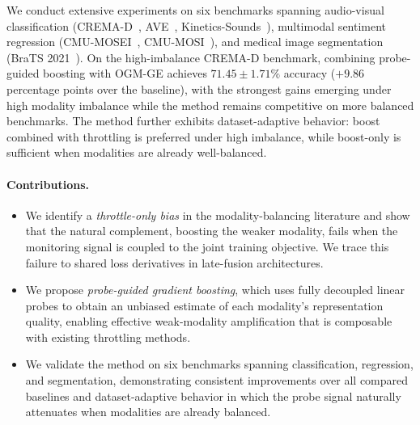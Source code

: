 \documentclass{article}
\begin{document}

We conduct extensive experiments on six benchmarks spanning audio-visual classification (CREMA-D~\citep{cao2014cremad}, AVE~\citep{tian2018ave}, Kinetics-Sounds~\citep{arandjelovic2017kinetics}), multimodal sentiment regression (CMU-MOSEI~\citep{zadeh2018mosei}, CMU-MOSI~\citep{zadeh2016mosi}), and medical image segmentation (BraTS 2021~\citep{baid2021brats}). On the high-imbalance CREMA-D benchmark, combining probe-guided boosting with OGM-GE achieves $71.45 \pm 1.71\%$ accuracy ($+9.86$ percentage points over the baseline), with the strongest gains emerging under high modality imbalance while the method remains competitive on more balanced benchmarks. The method further exhibits dataset-adaptive behavior: boost combined with throttling is preferred under high imbalance, while boost-only is sufficient when modalities are already well-balanced.

\paragraph{Contributions.}
\begin{itemize}
    \item We identify a \emph{throttle-only bias} in the modality-balancing literature and show that the natural complement, boosting the weaker modality, fails when the monitoring signal is coupled to the joint training objective. We trace this failure to shared loss derivatives in late-fusion architectures.

    \item We propose \emph{probe-guided gradient boosting}, which uses fully decoupled linear probes to obtain an unbiased estimate of each modality's representation quality, enabling effective weak-modality amplification that is composable with existing throttling methods.

    \item We validate the method on six benchmarks spanning classification, regression, and segmentation, demonstrating consistent improvements over all compared baselines and dataset-adaptive behavior in which the probe signal naturally attenuates when modalities are already balanced.
\end{itemize}


\end{document}
